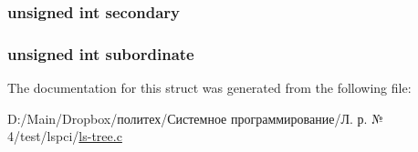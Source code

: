 \subsubsection[{\texorpdfstring{secondary}{secondary}}]{\setlength{\rightskip}{0pt plus 5cm}unsigned int secondary}\hypertarget{structbridge_a83e36dceeb07e456cb5820978d2bbc90}{}\label{structbridge_a83e36dceeb07e456cb5820978d2bbc90}
\subsubsection[{\texorpdfstring{subordinate}{subordinate}}]{\setlength{\rightskip}{0pt plus 5cm}unsigned int subordinate}\hypertarget{structbridge_ac2065cb9090fedd39708055ac52f8dba}{}\label{structbridge_ac2065cb9090fedd39708055ac52f8dba}


The documentation for this struct was generated from the following file\+:\begin{DoxyCompactItemize}
\item 
D\+:/\+Main/\+Dropbox/политех/Системное программирование/Л. р. № 4/test/lspci/\hyperlink{ls-tree_8c}{ls-\/tree.\+c}\end{DoxyCompactItemize}
